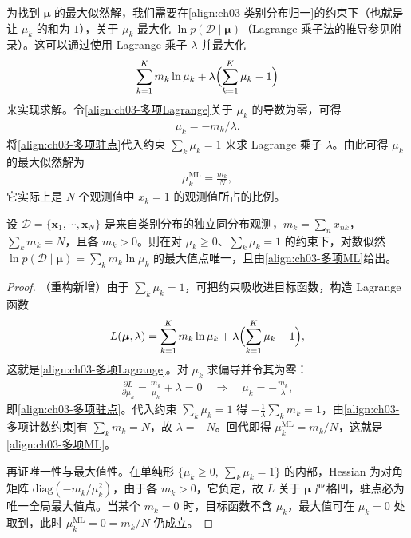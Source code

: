 \documentclass[../../main.tex]{subfiles}
\begin{document}
为找到 $\boldsymbol{\mu}$ 的最大似然解，我们需要在\eqref{align:ch03-类别分布归一}的约束下（也就是让 $\mu_k$ 的和为 $1$），关于 $\mu_k$ 最大化 $\ln p(\mathcal{D}\mid\boldsymbol{\mu})$（Lagrange 乘子法的推导参见附录）。这可以通过使用 Lagrange 乘子 $\lambda$ 并最大化
\begin{align}
\sum_{k=1}^{K}m_k\ln\mu_k+\lambda\Bigl(\sum_{k=1}^{K}\mu_k-1\Bigr)
\label{align:ch03-多项Lagrange}
\end{align}
来实现求解。令\eqref{align:ch03-多项Lagrange}关于 $\mu_k$ 的导数为零，可得
\begin{align}
\mu_k=-m_k/\lambda.
\label{align:ch03-多项驻点}
\end{align}
将\eqref{align:ch03-多项驻点}代入约束 $\sum_k\mu_k=1$ 来求 Lagrange 乘子 $\lambda$。由此可得 $\mu_k$ 的最大似然解为
\begin{align}
\mu_k^{\mathrm{ML}}=\frac{m_k}{N},
\label{align:ch03-多项ML}
\end{align}
它实际上是 $N$ 个观测值中 $x_k=1$ 的观测值所占的比例。

\begin{proposition}[类别分布的最大似然估计]\label{proposition:ch03-多项最大似然}
设 $\mathcal{D}=\{\boldsymbol{x}_1,\cdots,\boldsymbol{x}_N\}$ 是来自类别分布的独立同分布观测，$m_k=\sum_{n}x_{nk}$，$\sum_k m_k=N$，且各 $m_k>0$。则在对 $\mu_k\geqslant0$、$\sum_k\mu_k=1$ 的约束下，对数似然 $\ln p(\mathcal{D}\mid\boldsymbol{\mu})=\sum_k m_k\ln\mu_k$ 的最大值点唯一，且由\eqref{align:ch03-多项ML}给出。
\end{proposition}
\begin{proof}
（重构新增）由于 $\sum_k\mu_k=1$，可把约束吸收进目标函数，构造 Lagrange 函数
\begin{align*}
L(\boldsymbol{\mu},\lambda)=\sum_{k=1}^{K}m_k\ln\mu_k+\lambda\Bigl(\sum_{k=1}^{K}\mu_k-1\Bigr),
\end{align*}
这就是\eqref{align:ch03-多项Lagrange}。对 $\mu_k$ 求偏导并令其为零：
\begin{align*}
\frac{\partial L}{\partial\mu_k}=\frac{m_k}{\mu_k}+\lambda=0\quad\Longrightarrow\quad\mu_k=-\frac{m_k}{\lambda},
\end{align*}
即\eqref{align:ch03-多项驻点}。代入约束 $\sum_k\mu_k=1$ 得 $-\frac{1}{\lambda}\sum_k m_k=1$，由\eqref{align:ch03-多项计数约束}有 $\sum_k m_k=N$，故 $\lambda=-N$。回代即得 $\mu_k^{\mathrm{ML}}=m_k/N$，这就是\eqref{align:ch03-多项ML}。

再证唯一性与最大值性。在单纯形 $\{\mu_k\geqslant0,\ \sum_k\mu_k=1\}$ 的内部，Hessian 为对角矩阵 $\mathrm{diag}(-m_k/\mu_k^{2})$，由于各 $m_k>0$，它负定，故 $L$ 关于 $\boldsymbol{\mu}$ 严格凹，驻点必为唯一全局最大值点。当某个 $m_k=0$ 时，目标函数不含 $\mu_k$，最大值可在 $\mu_k=0$ 处取到，此时 $\mu_k^{\mathrm{ML}}=0=m_k/N$ 仍成立。
\end{proof}
\end{document}
